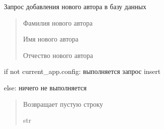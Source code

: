 \documentclass[letterpaper,10pt,russian]{sphinxmanual}
\begin{document}

\begin{fulllineitems}
\label{\detokenize{blueprints:blueprints.add_to_database.add_new_author}}
\pysigstartsignatures
{}
\pysigstopsignatures
\sphinxAtStartPar
Запрос добавления нового автора в базу данных
\begin{description}
\begin{quote}\begin{description}
\sphinxAtStartPar
Фамилия нового автора

\sphinxAtStartPar
Имя нового автора

\sphinxAtStartPar
Отчество нового автора

\end{description}\end{quote}

\sphinxAtStartPar
if not current\_app.config: выполняется запрос insert

\sphinxAtStartPar
else: ничего не выполняется

\end{description}
\begin{quote}\begin{description}
\sphinxAtStartPar
Возвращает пустую строку

\sphinxAtStartPar
str

\end{description}\end{quote}

\end{fulllineitems}

\end{document}
